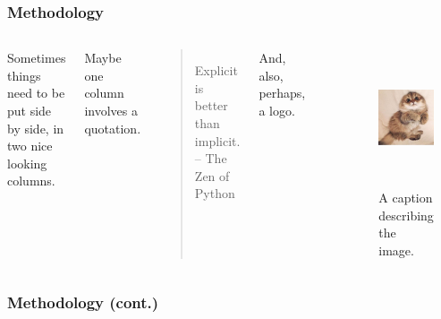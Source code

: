 \begin{frame}
  \frametitle{Methodology}
        \begin{columns}
                \column[t]{5cm}
                Sometimes things need to be put side by side, in two nice 
                looking columns. 

                Maybe one column involves a quotation.

                \begin{quote}
                        Explicit is better than implicit. -- The Zen of Python
                \end{quote}


                And, also, perhaps, a logo.
                \begin{center}
                        \includegraphics[height=0.2\textheight]{./images/arfc-logo}
                \end{center}
                \column[t]{5cm}
        \begin{figure}[htbp!]
        \begin{center}
      \includegraphics[height=4cm]{./images/kitten.png}
    \end{center}
          \caption{A caption describing the image. }
    \label{fig:kittenfigure}
  \end{figure}
        \end{columns}
\end{frame}

\begin{frame}
  \frametitle{Methodology (cont.)}
        
\end{frame}
